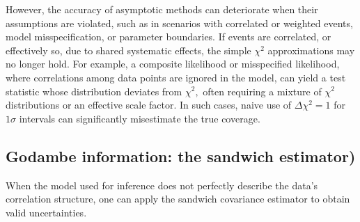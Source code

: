         However, the accuracy of asymptotic methods can deteriorate when their assumptions are violated, such as in scenarios with correlated or weighted events, model misspecification, or parameter boundaries.
        If events are correlated, or effectively so, due to shared systematic effects, the simple $\chi^2$ approximations may no longer hold.
        For example, a composite likelihood or misspecified likelihood, where correlations among data points are ignored in the model, can yield a test statistic whose distribution deviates from $\chi^2,$ often requiring a mixture of $\chi^2$ distributions or an effective scale factor\cite{li_optimal_2024, jamil_pairwise_2024, tang_is_2025, Fowlie:2021ldv, Ansarifard:2025hec}.
        In such cases, naive use of $\Delta\chi^2=1$ for $1\sigma$ intervals can significantly misestimate the true coverage.

        \subsection{Godambe information: the sandwich estimator)}
            When the model used for inference does not perfectly describe the data's correlation structure, one can apply the sandwich covariance estimator to obtain valid uncertainties.

